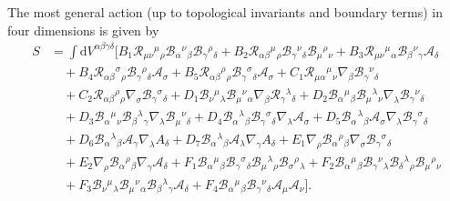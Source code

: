 \documentclass{article}
\begin{document}
The most general action (up to topological invariants and boundary terms) in four dimensions is given by
\begin{equation}
    \label{PAG_action}
    \begin{split}
    S
    & =
    \int  \mathrm{d}V^{\alpha \beta \gamma \delta} \bigg[
    B_1 \mathcal{R}_{\mu\nu}{}^{\mu}{}_{\rho}\mathcal{B}_{\alpha}{}^{\nu}{}_{\beta}\mathcal{B}_{\gamma}{}^{\rho}{}_{\delta}
    + B_2 \mathcal{R}_{\alpha\beta}{}^{\mu}{}_{\rho} \mathcal{B}_{\gamma}{}^{\nu}{}_{\delta} \mathcal{B}_{\mu}{}^{\rho}{}_{\nu}
    + B_3 \mathcal{R}_{\mu\nu}{}^{\mu}{}_{\alpha} \mathcal{B}_{\beta}{}^{\nu}{}_{\gamma} \mathcal{A}_\delta
    \\
    & \quad
    + B_4 \mathcal{R}_{\alpha\beta}{}^{\sigma}{}_{\rho}\mathcal{B}_{\gamma}{}^{\rho}{}_{\delta}\mathcal{A}_\sigma
    + B_5 \mathcal{R}_{\alpha \beta}{}^{\rho}{}_{\rho} \mathcal{B}_{\gamma}{}^{\sigma}{}_{\delta} \mathcal{A}_\sigma
    + C_1 \mathcal{R}_{\mu\alpha}{}^{\mu}{}_{\nu} \nabla_\beta \mathcal{B}_{\gamma}{}^{\nu}{}_{\delta}
    \\
    & \quad
    + C_2 \mathcal{R}_{\alpha\beta}{}^{\rho}{}_{\rho} \nabla_\sigma \mathcal{B}_{\gamma}{}^{\sigma}{}_{\delta}
    + D_1 \mathcal{B}_{\nu}{}^{\mu}{}_{\lambda} \mathcal{B}_{\mu}{}^{\nu}{}_{\alpha} \nabla_\beta \mathcal{R}_{\gamma}{}^{\lambda}{}_{\delta}
    + D_2 \mathcal{B}_{\alpha}{}^{\mu}{}_{\beta} \mathcal{B}_{\mu}{}^{\lambda}{}_{\nu} \nabla_{\lambda} \mathcal{B}_{\gamma}{}^{\nu}{}_{\delta}
    \\
    & \quad
    + D_3 \mathcal{B}_{\alpha}{}^{\mu}{}_{\nu}\mathcal{B}_{\beta}{}^{\lambda}{}_{\gamma} \nabla_\lambda \mathcal{B}_{\mu}{}^{\nu}{}_{\delta}
    + D_4 \mathcal{B}_{\alpha}{}^{\lambda}{}_{\beta}\mathcal{B}_{\gamma}{}^{\sigma}{}_{\delta}\nabla_\lambda \mathcal{A}_\sigma
    + D_5 \mathcal{B}_{\alpha}{}^{\lambda}{}_{\beta} \mathcal{A}_\sigma \nabla_\lambda \mathcal{B}_{\gamma}{}^{\sigma}{}_{\delta}
    \\
    &\quad
    + D_6 \mathcal{B}_{\alpha}{}^{\lambda}{}_{\beta}\mathcal{A}_\gamma \nabla_\lambda A_\delta
    + D_7\mathcal{B}_{\alpha}{}^{\lambda}{}_{\beta} \mathcal{A}_\lambda \nabla_\gamma A_\delta
    + E_1\nabla_\rho \mathcal{B}_{\alpha}{}^{\rho}{}_{\beta} \nabla_\sigma \mathcal{B}_{\gamma}{}^{\sigma}{}_{\delta}
    \\
    &\quad
    + E_2 \nabla_\rho \mathcal{B}_{\alpha}{}^{\rho}{}_{\beta} \nabla_\gamma \mathcal{A}_\delta
    + F_1 \mathcal{B}_{\alpha}{}^{\mu}{}_{\beta} \mathcal{B}_{\gamma}{}^{\sigma}{}_{\delta} \mathcal{B}_{\mu}{}^{\lambda}{}_{\rho} \mathcal{B}_{\sigma}{}^{\rho}{}_{\lambda}
    + F_2\mathcal{B}_{\alpha}{}^{\mu}{}_{\beta} \mathcal{B}_{\gamma}{}^{\nu}{}_{\lambda} \mathcal{B}_{\delta}{}^{\lambda}{}_{\rho} \mathcal{B}_{\mu}{}^{\rho}{}_{\nu}
    \\
    &\quad
    + F_3 \mathcal{B}_{\nu}{}^{\mu}{}_{\lambda} \mathcal{B}_{\mu}{}^{\nu}{}_{\alpha} \mathcal{B}_{\beta}{}^{\lambda}{}_{\gamma} \mathcal{A}_\delta
    + F_4 \mathcal{B}_{\alpha}{}^{\mu}{}_{\beta}\mathcal{B}_{\gamma}{}^{\nu}{}_{\delta}\mathcal{A}_\mu \mathcal{A}_\nu \bigg].
    \end{split}
\end{equation}
\end{document}
